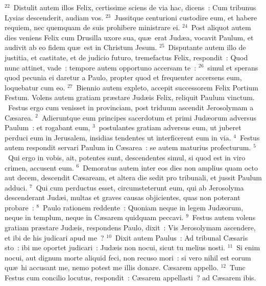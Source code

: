 ${}^{22}$~Distulit autem illos Felix, certissime sciens de via hac, dicens~: Cum tribunus Lysias descenderit, audiam vos.
${}^{23}$~Jussitque centurioni custodire eum, et habere requiem, nec quemquam de suis prohibere ministrare ei.
${}^{24}$~Post aliquot autem dies veniens Felix cum Drusilla uxore sua, qu\ae\ erat Jud\ae a, vocavit Paulum, et audivit ab eo fidem qu\ae\ est in Christum Jesum.
${}^{25}$~Disputante autem illo de justitia, et castitate, et de judicio futuro, tremefactus Felix, respondit~: Quod nunc attinet, vade~: tempore autem opportuno accersam te~:
${}^{26}$~simul et sperans quod pecunia ei daretur a Paulo, propter quod et frequenter accersens eum, loquebatur cum eo.
${}^{27}$~Biennio autem expleto, accepit successorem Felix Portium Festum. Volens autem gratiam pr\ae stare Jud\ae is Felix, reliquit Paulum vinctum.
~Festus ergo cum venisset in provinciam, post triduum ascendit Jerosolymam a C\ae sarea.
${}^{2}$~Adieruntque eum principes sacerdotum et primi Jud\ae orum adversus Paulum~: et rogabant eum,
${}^{3}$~postulantes gratiam adversus eum, ut juberet perduci eum in Jerusalem, insidias tendentes ut interficerent eum in via.
${}^{4}$~Festus autem respondit servari Paulum in C\ae sarea~: se autem maturius profecturum.
${}^{5}$~Qui ergo in vobis, ait, potentes sunt, descendentes simul, si quod est in viro crimen, accusent eum.
${}^{6}$~Demoratus autem inter eos dies non amplius quam octo aut decem, descendit C\ae saream, et altera die sedit pro tribunali, et jussit Paulum adduci.
${}^{7}$~Qui cum perductus esset, circumsteterunt eum, qui ab Jerosolyma descenderant Jud\ae i, multas et graves causas objicientes, quas non poterant probare~:
${}^{8}$~Paulo rationem reddente~: Quoniam neque in legem Jud\ae orum, neque in templum, neque in C\ae sarem quidquam peccavi.
${}^{9}$~Festus autem volens gratiam pr\ae stare Jud\ae is, respondens Paulo, dixit~: Vis Jerosolymam ascendere, et ibi de his judicari apud me~?
${}^{10}$~Dixit autem Paulus~: Ad tribunal C\ae saris sto~: ibi me oportet judicari~: Jud\ae is non nocui, sicut tu melius nosti.
${}^{11}$~Si enim nocui, aut dignum morte aliquid feci, non recuso mori~: si vero nihil est eorum qu\ae\ hi accusant me, nemo potest me illis donare. C\ae sarem appello.
${}^{12}$~Tunc Festus cum concilio locutus, respondit~: C\ae sarem appellasti~? ad C\ae sarem ibis.



